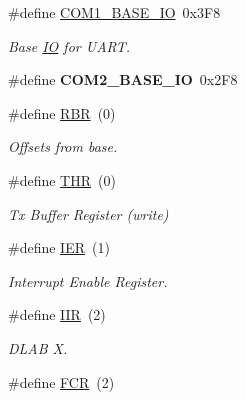 \begin{DoxyCompactItemize}
\mbox{\label{group__i386__uart_ga91063596cfb46c8b8d7f6eb289dd448e}} 
\#define \mbox{\hyperlink{group__i386__uart_ga91063596cfb46c8b8d7f6eb289dd448e}{C\+O\+M1\+\_\+\+B\+A\+S\+E\+\_\+\+IO}}~0x3\+F8
\begin{DoxyCompactList}\small\item\em Base \mbox{\hyperlink{structIO}{IO}} for U\+A\+RT. \end{DoxyCompactList}\item 
\mbox{\label{group__i386__uart_ga38105c391711071ff7e61fe54f1d83fd}} 
\#define {\bfseries C\+O\+M2\+\_\+\+B\+A\+S\+E\+\_\+\+IO}~0x2\+F8
\item 
\#define \mbox{\hyperlink{group__i386__uart_gaa6f7e7a9f4551d6151f9d45362118a50}{R\+BR}}~(0)
\begin{DoxyCompactList}\small\item\em Offsets from base. \end{DoxyCompactList}\item 
\mbox{\label{group__i386__uart_ga5e9787adf3c9afcc4b781e85bb545b35}} 
\#define \mbox{\hyperlink{group__i386__uart_ga5e9787adf3c9afcc4b781e85bb545b35}{T\+HR}}~(0)
\begin{DoxyCompactList}\small\item\em Tx Buffer Register (write) \end{DoxyCompactList}\item 
\mbox{\label{group__i386__uart_ga3e27fa35f9febccdc4a0c28a5c8cffbb}} 
\#define \mbox{\hyperlink{group__i386__uart_ga3e27fa35f9febccdc4a0c28a5c8cffbb}{I\+ER}}~(1)
\begin{DoxyCompactList}\small\item\em Interrupt Enable Register. \end{DoxyCompactList}\item 
\#define \mbox{\hyperlink{group__i386__uart_ga67004975983f9c99226d63db17ba74c4}{I\+IR}}~(2)
\begin{DoxyCompactList}\small\item\em D\+L\+AB X. \end{DoxyCompactList}\item 
\mbox{\label{group__i386__uart_ga264b36b13386e3f62fe69e04711bc006}} 
\#define \mbox{\hyperlink{group__i386__uart_ga264b36b13386e3f62fe69e04711bc006}{F\+CR}}~(2)

\end{DoxyCompactItemize}
